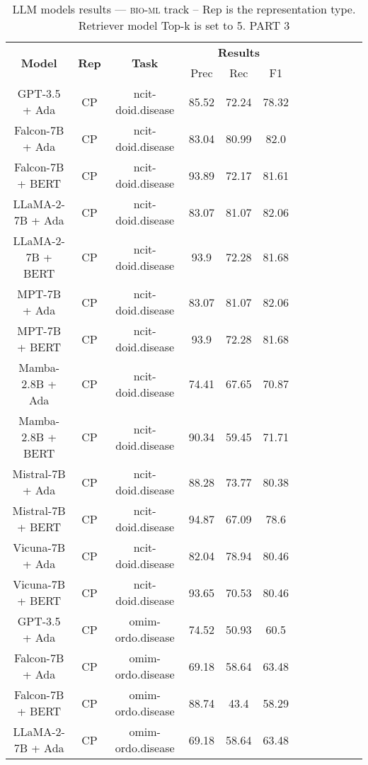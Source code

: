 \begin{table}
        \centering
        \small
        \caption{LLM models results --- \textsc{bio-ml} track -- Rep is the representation type. Retriever model Top-k is set to 5. PART 3 } \label{tab:llm_bio-ml3}
        \begin{tabular}{|c|c|c|c|c|c|c|c|c|c|c|c|}
            \hline
             \multirow{2}{*}{\textbf{Model}}  & \multirow{2}{*}{\textbf{Rep}}  & \multirow{2}{*}{\textbf{Task}} &  \multicolumn{3}{c|}{\textbf{Results}} \\
             \cline{4-6}
              & & & Prec & Rec & F1  \\
            \hline
	GPT-3.5 + Ada  & CP & ncit-doid.disease  &  85.52 &  72.24 & 78.32  \\
	Falcon-7B + Ada  & CP & ncit-doid.disease  &  83.04 &  80.99 & 82.0  \\
	Falcon-7B + BERT  & CP & ncit-doid.disease  &  93.89 &  72.17 & 81.61  \\
	LLaMA-2-7B + Ada  & CP & ncit-doid.disease  &  83.07 &  81.07 & 82.06  \\
	LLaMA-2-7B + BERT  & CP & ncit-doid.disease  &  93.9 &  72.28 & 81.68  \\
	MPT-7B + Ada  & CP & ncit-doid.disease  &  83.07 &  81.07 & 82.06  \\
	MPT-7B + BERT  & CP & ncit-doid.disease  &  93.9 &  72.28 & 81.68  \\
	Mamba-2.8B + Ada  & CP & ncit-doid.disease  &  74.41 &  67.65 & 70.87  \\
	Mamba-2.8B + BERT  & CP & ncit-doid.disease  &  90.34 &  59.45 & 71.71  \\
	Mistral-7B + Ada  & CP & ncit-doid.disease  &  88.28 &  73.77 & 80.38  \\
	Mistral-7B + BERT  & CP & ncit-doid.disease  &  94.87 &  67.09 & 78.6  \\
	Vicuna-7B + Ada  & CP & ncit-doid.disease  &  82.04 &  78.94 & 80.46  \\
	Vicuna-7B + BERT  & CP & ncit-doid.disease  &  93.65 &  70.53 & 80.46  \\
	\hline
	GPT-3.5 + Ada  & CP & omim-ordo.disease  &  74.52 &  50.93 & 60.5  \\
	Falcon-7B + Ada  & CP & omim-ordo.disease  &  69.18 &  58.64 & 63.48  \\
	Falcon-7B + BERT  & CP & omim-ordo.disease  &  88.74 &  43.4 & 58.29  \\
	LLaMA-2-7B + Ada  & CP & omim-ordo.disease  &  69.18 &  58.64 & 63.48  \\

\end{tabular}
\end{table}
